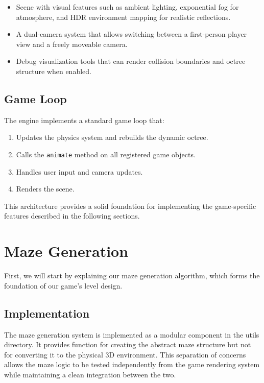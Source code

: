 \documentclass{article}
\begin{document}
\begin{itemize}
    \item Scene with visual features such as ambient lighting, exponential fog for atmosphere, and HDR environment mapping for realistic reflections.
    
    \item A dual-camera system that allows switching between a first-person player view and a freely moveable camera.
    
    \item Debug visualization tools that can render collision boundaries and octree structure when enabled.
\end{itemize}

\subsection{Game Loop}
The engine implements a standard game loop that:

\begin{enumerate}
    \item Updates the physics system and rebuilds the dynamic octree.
    \item Calls the \texttt{animate} method on all registered game objects.
    \item Handles user input and camera updates.
    \item Renders the scene.
\end{enumerate}

This architecture provides a solid foundation for implementing the game-specific features described in the following sections.

\section{Maze Generation}
First, we will start by explaining our maze generation algorithm, which forms the foundation of our game's level design.

\subsection{Implementation}

The maze generation system is implemented as a modular component in the utils directory. It provides function for creating the abstract maze structure but not for converting it to the physical 3D environment. This separation of concerns allows the maze logic to be tested independently from the game rendering system while maintaining a clean integration between the two.
\end{document}
